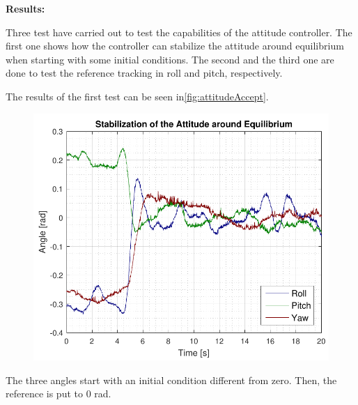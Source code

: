 \textbf{Results:}

Three test have carried out to test the capabilities of the attitude controller. The first one shows how the controller can stabilize the attitude around equilibrium when starting with some initial conditions. The second and the third one are done to test the reference tracking in roll and pitch, respectively.

The results of the first test can be seen in\autoref{fig:attitudeAccept}.
%
\begin{figure}[H]
	\includegraphics[scale=.8]{figures/attitudeAccept.pdf}
	\centering			
	\label{fig:attitudeAccept}
\end{figure} 
%
The three angles start with an initial condition different from zero. Then, the reference is put to 0 rad. 

